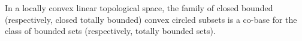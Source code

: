 In a locally convex linear topological space, the family of closed bounded (respectively, closed totally bounded) convex circled subsets is a co-base for the class of bounded sets (respectively, totally bounded sets).
